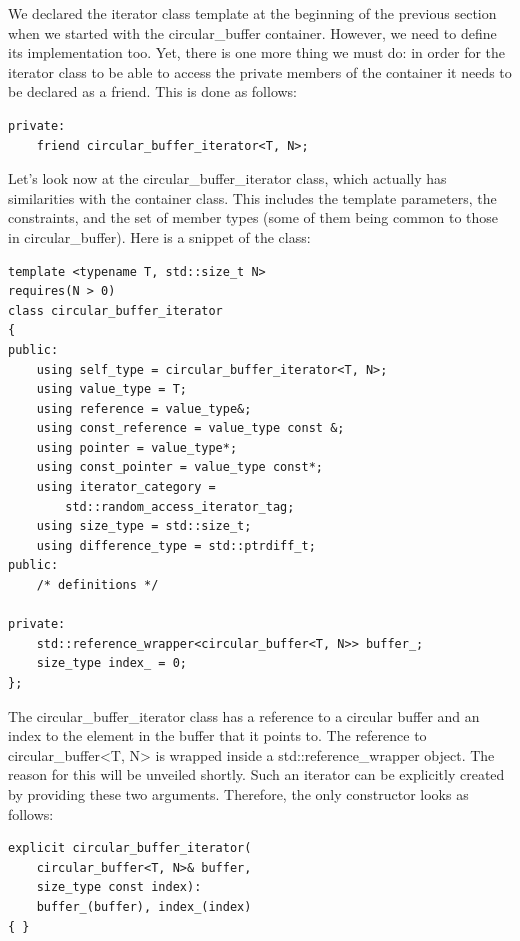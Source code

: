 
We declared the iterator class template at the beginning of the previous section when we started with the circular\_buffer container. However, we need to define its implementation too. Yet, there is one more thing we must do: in order for the iterator class to be able to access the private members of the container it needs to be declared as a friend. This is done as follows:

\begin{lstlisting}[style=styleCXX]
private:
	friend circular_buffer_iterator<T, N>;
\end{lstlisting}

Let’s look now at the circular\_buffer\_iterator class, which actually has similarities with the container class. This includes the template parameters, the constraints, and the set of member types (some of them being common to those in circular\_buffer). Here is a snippet of the class:

\begin{lstlisting}[style=styleCXX]
template <typename T, std::size_t N>
requires(N > 0)
class circular_buffer_iterator
{
public:
	using self_type = circular_buffer_iterator<T, N>;
	using value_type = T;
	using reference = value_type&;
	using const_reference = value_type const &;
	using pointer = value_type*;
	using const_pointer = value_type const*;
	using iterator_category =
		std::random_access_iterator_tag;
	using size_type = std::size_t;
	using difference_type = std::ptrdiff_t;
public:
	/* definitions */
	
private:
	std::reference_wrapper<circular_buffer<T, N>> buffer_;
	size_type index_ = 0;
};
\end{lstlisting}

The circular\_buffer\_iterator class has a reference to a circular buffer and an index to the element in the buffer that it points to. The reference to circular\_buffer<T, N> is wrapped inside a std::reference\_wrapper object. The reason for this will be unveiled shortly. Such an iterator can be explicitly created by providing these two arguments. Therefore, the only constructor looks as follows:

\begin{lstlisting}[style=styleCXX]
explicit circular_buffer_iterator(
	circular_buffer<T, N>& buffer,
	size_type const index):
	buffer_(buffer), index_(index)
{ }
\end{lstlisting}

